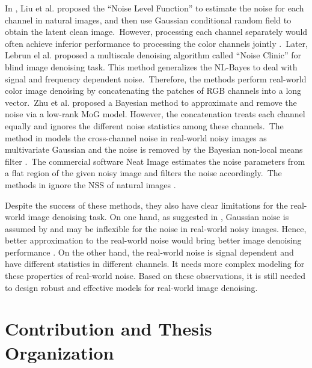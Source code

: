 In \cite{Liu2008}, Liu et al. proposed the ``Noise Level Function'' to estimate the noise for each channel in natural images, and then use Gaussian conditional random field to obtain the latent clean image.\ However, processing each channel separately would often achieve inferior performance to processing the color channels jointly \cite{mairal2008sparse}.\ Later, Lebrun el al. proposed a multiscale denoising algorithm called ``Noise Clinic'' \cite{noiseclinic} for blind image denoising task. This method generalizes the NL-Bayes \cite{nlbayes} to deal with signal and frequency dependent noise.\ Therefore, the methods \cite{noiseclinic,ncwebsite,Zhu_2016_CVPR} perform real-world color image denoising by concatenating the patches of RGB channels into a long vector.\ Zhu et al. \cite{Zhu_2016_CVPR} proposed a Bayesian method to approximate and remove the noise via a low-rank MoG model. However, the concatenation treats each channel equally and ignores the different noise statistics among these channels.\ The method in \cite{crosschannel2016} models the cross-channel noise in real-world noisy images as multivariate Gaussian and the noise is removed by the Bayesian non-local means filter \cite{kervrann2007bayesian}.\ The commercial software Neat Image \cite{neatimage} estimates the noise parameters from a flat region of the given noisy image and filters the noise accordingly.\ The methods in \cite{crosschannel2016,neatimage} ignore the NSS of natural images \cite{nlm}. 


Despite the success of these methods, they also have clear limitations for the real-world image denoising task. On one hand, as suggested in \cite{Liu2008,noiseclinic}, Gaussian noise is assumed by \cite{fullyblind,rabie2005robust,Liu2008} and may be inflexible for the noise in real-world noisy images. Hence, better approximation to the real-world noise would bring better image denoising performance \cite{Liu2008,noiseclinic}. On the other hand, the real-world noise is signal dependent and have different statistics in different channels. It needs more complex modeling for these properties of real-world noise. Based on these observations, it is still needed to design robust and effective models for real-world image denoising.


\section{Contribution and Thesis Organization}
\label{sec:intro:new}

